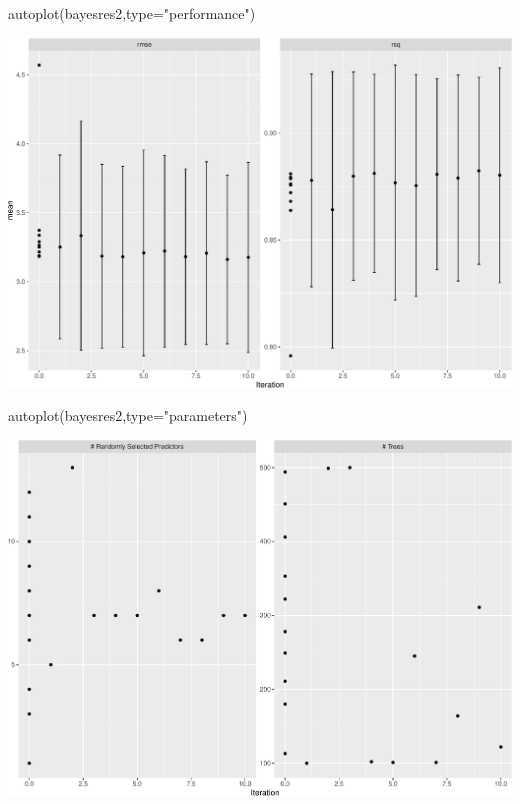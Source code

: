 \documentclass[
  ignorenonframetext,
]{beamer}
\newenvironment{Shaded}{\begin{snugshade}}{\end{snugshade}}
\newcommand{\AttributeTok}[1]{\textcolor[rgb]{0.77,0.63,0.00}{#1}}
\newcommand{\FunctionTok}[1]{\textcolor[rgb]{0.00,0.00,0.00}{#1}}
\newcommand{\NormalTok}[1]{#1}
\newcommand{\StringTok}[1]{\textcolor[rgb]{0.31,0.60,0.02}{#1}}
\begin{document}
\begin{frame}[fragile]
\begin{Shaded}
\begin{Highlighting}[]
\FunctionTok{autoplot}\NormalTok{(bayesres2,}\AttributeTok{type=}\StringTok{"performance"}\NormalTok{)}
\end{Highlighting}
\end{Shaded}

\includegraphics{L7_files/figure-beamer/unnamed-chunk-11-1.pdf}

\begin{Shaded}
\begin{Highlighting}[]
\FunctionTok{autoplot}\NormalTok{(bayesres2,}\AttributeTok{type=}\StringTok{"parameters"}\NormalTok{)}
\end{Highlighting}
\end{Shaded}

\includegraphics{L7_files/figure-beamer/unnamed-chunk-11-2.pdf}
\end{frame}
\end{document}
